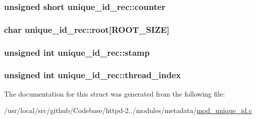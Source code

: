 \subsubsection[{\texorpdfstring{counter}{counter}}]{\setlength{\rightskip}{0pt plus 5cm}unsigned short unique\+\_\+id\+\_\+rec\+::counter}\hypertarget{structunique__id__rec_a81865096b7bc43a9569dbcc7caf5ab30}{}\label{structunique__id__rec_a81865096b7bc43a9569dbcc7caf5ab30}
\subsubsection[{\texorpdfstring{root}{root}}]{\setlength{\rightskip}{0pt plus 5cm}char unique\+\_\+id\+\_\+rec\+::root\mbox{[}{\bf R\+O\+O\+T\+\_\+\+S\+I\+ZE}\mbox{]}}\hypertarget{structunique__id__rec_aa755eaf5c4bd3db3b909f0cb51f663ba}{}\label{structunique__id__rec_aa755eaf5c4bd3db3b909f0cb51f663ba}
\subsubsection[{\texorpdfstring{stamp}{stamp}}]{\setlength{\rightskip}{0pt plus 5cm}unsigned {\bf int} unique\+\_\+id\+\_\+rec\+::stamp}\hypertarget{structunique__id__rec_a7e7857cbaf065266aa2895b1291e6062}{}\label{structunique__id__rec_a7e7857cbaf065266aa2895b1291e6062}
\subsubsection[{\texorpdfstring{thread\+\_\+index}{thread_index}}]{\setlength{\rightskip}{0pt plus 5cm}unsigned {\bf int} unique\+\_\+id\+\_\+rec\+::thread\+\_\+index}\hypertarget{structunique__id__rec_a6704f4f0f55a4316e7c100d4b4262df9}{}\label{structunique__id__rec_a6704f4f0f55a4316e7c100d4b4262df9}


The documentation for this struct was generated from the following file\+:\begin{DoxyCompactItemize}
\item 
/usr/local/src/github/\+Codebase/httpd-\/2../modules/metadata/\hyperlink{mod__unique__id_8c}{mod\+\_\+unique\+\_\+id.\+c}\end{DoxyCompactItemize}
